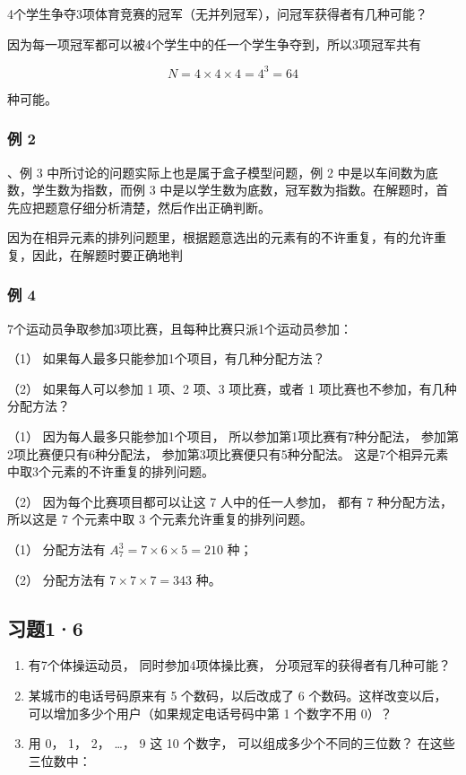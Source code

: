 4个学生争夺3项体育竞赛的冠军（无并列冠军），问冠军获得者有几种可能？

因为每一项冠军都可以被4个学生中的任一个学生争夺到，所以3项冠军共有

\[
N = 4 \times 4 \times 4 = 4 ^ {3} = 64
\]

种可能。

\subsubsection{例 2}

、例 3 中所讨论的问题实际上也是属于盒子模型问题，例 2
中是以车间数为底数，学生数为指数，而例 3
中是以学生数为底数，冠军数为指数。在解题时，首先应把题意仔细分析清楚，然后作出正确判断。

因为在相异元素的排列问题里，根据题意选出的元素有的不许重复，有的允许重复，因此，在解题时要正确地判

\subsubsection{例 4}

7个运动员争取参加3项比赛，且每种比赛只派1个运动员参加：

（1） 如果每人最多只能参加1个项目，有几种分配方法？

（2） 如果每人可以参加 1 项、2 项、3 项比赛，或者 1
项比赛也不参加，有几种分配方法？

 （1） 因为每人最多只能参加1个项目，
所以参加第1项比赛有7种分配法， 参加第2项比赛便只有6种分配法，
参加第3项比赛便只有5种分配法。
这是7个相异元素中取3个元素的不许重复的排列问题。

（2） 因为每个比赛项目都可以让这 7 人中的任一人参加， 都有 7
种分配方法， 所以这是 7 个元素中取 3 个元素允许重复的排列问题。

 （1） 分配方法有
\(A_{7}^{3} = 7 \times 6 \times 5 = 210\) 种；

（2） 分配方法有 \(7 \times 7 \times 7 = 343\) 种。

\subsection{习题1·6}

\begin{enumerate}
\item
  有7个体操运动员， 同时参加4项体操比赛， 分项冠军的获得者有几种可能？
\item
  某城市的电话号码原来有 5 个数码，以后改成了 6
  个数码。这样改变以后，可以增加多少个用户（如果规定电话号码中第 1
  个数字不用 0）？
\item
  用 0， 1， 2， \ldots， 9 这 10 个数字， 可以组成多少个不同的三位数？
  在这些三位数中：
\end{enumerate}

